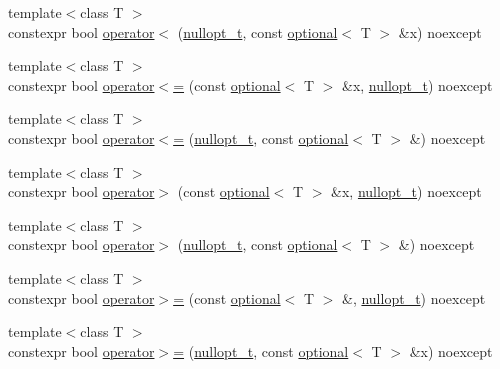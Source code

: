 \begin{DoxyCompactItemize}
\item 
{\footnotesize template$<$class T $>$ }\\constexpr bool \hyperlink{namespacestd_1_1experimental_a419ed2da725cc9c030f5d741a1f13d50}{operator$<$} (\hyperlink{structstd_1_1experimental_1_1nullopt__t}{nullopt\+\_\+t}, const \hyperlink{classstd_1_1experimental_1_1optional}{optional}$<$ T $>$ \&x) noexcept
\item 
{\footnotesize template$<$class T $>$ }\\constexpr bool \hyperlink{namespacestd_1_1experimental_a2130b2ce528946a4ef4e56f80d823267}{operator$<$=} (const \hyperlink{classstd_1_1experimental_1_1optional}{optional}$<$ T $>$ \&x, \hyperlink{structstd_1_1experimental_1_1nullopt__t}{nullopt\+\_\+t}) noexcept
\item 
{\footnotesize template$<$class T $>$ }\\constexpr bool \hyperlink{namespacestd_1_1experimental_ae72fae9caf85b2dff2e94ebd29371937}{operator$<$=} (\hyperlink{structstd_1_1experimental_1_1nullopt__t}{nullopt\+\_\+t}, const \hyperlink{classstd_1_1experimental_1_1optional}{optional}$<$ T $>$ \&) noexcept
\item 
{\footnotesize template$<$class T $>$ }\\constexpr bool \hyperlink{namespacestd_1_1experimental_ab0139892916a389ed15c89675d5512ac}{operator$>$} (const \hyperlink{classstd_1_1experimental_1_1optional}{optional}$<$ T $>$ \&x, \hyperlink{structstd_1_1experimental_1_1nullopt__t}{nullopt\+\_\+t}) noexcept
\item 
{\footnotesize template$<$class T $>$ }\\constexpr bool \hyperlink{namespacestd_1_1experimental_a02002e302d09fd9596aadd26a38043c0}{operator$>$} (\hyperlink{structstd_1_1experimental_1_1nullopt__t}{nullopt\+\_\+t}, const \hyperlink{classstd_1_1experimental_1_1optional}{optional}$<$ T $>$ \&) noexcept
\item 
{\footnotesize template$<$class T $>$ }\\constexpr bool \hyperlink{namespacestd_1_1experimental_a35cdc6a5b56b8db5690f4035242332a0}{operator$>$=} (const \hyperlink{classstd_1_1experimental_1_1optional}{optional}$<$ T $>$ \&, \hyperlink{structstd_1_1experimental_1_1nullopt__t}{nullopt\+\_\+t}) noexcept
\item 
{\footnotesize template$<$class T $>$ }\\constexpr bool \hyperlink{namespacestd_1_1experimental_aec1ef0d119fb9270b05212cea79a0fe0}{operator$>$=} (\hyperlink{structstd_1_1experimental_1_1nullopt__t}{nullopt\+\_\+t}, const \hyperlink{classstd_1_1experimental_1_1optional}{optional}$<$ T $>$ \&x) noexcept

\end{DoxyCompactItemize}
